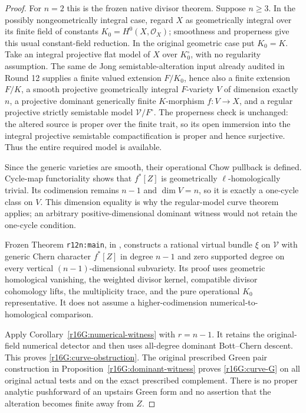 \begin{proof}
For $n=2$ this is the frozen native divisor theorem.  Suppose
$n\geq3$.  In the possibly nongeometrically integral case,
regard $X$ as geometrically integral over its finite field
of constants $K_0=H^0(X,\mathcal O_X)$; smoothness and
properness give this usual constant-field reduction.
In the original geometric case put $K_0=K$.
Take an integral projective flat model of $X$ over
$K_0^\circ$, with no regularity assumption.  The same
de Jong semistable-alteration input already audited in
Round 12 supplies a finite valued extension $F/K_0$, hence
also a finite extension $F/K$, a smooth
projective geometrically integral $F$-variety $V$ of
dimension exactly $n$, a projective dominant generically
finite $K$-morphism $f:V\to X$, and a regular projective
strictly semistable model $\mathcal V/F^\circ$.
The properness check is unchanged: the altered source is
proper over the finite trait, so its open immersion into
the integral projective semistable compactification is
proper and hence surjective.  Thus the entire required
model is available.

Since the generic varieties are smooth, their operational
Chow pullback is defined.  Cycle-map functoriality shows
that $f^*[Z]$ is geometrically $\ell$-homologically trivial.
Its codimension remains $n-1$ and $\dim V=n$, so it is
exactly a one-cycle class on $V$.  This dimension equality
is why the regular-model curve theorem applies; an
arbitrary positive-dimensional dominant witness would
not retain the one-cycle condition.

Frozen Theorem \texttt{r12n:main}, in
,
constructs a rational virtual bundle $\xi$ on
$\mathcal V$ with generic Chern character $f^*[Z]$ in
degree $n-1$ and zero supported degree on every vertical
$(n-1)$-dimensional subvariety.  Its proof uses geometric
homological vanishing, the weighted divisor kernel,
compatible divisor cohomology lifts, the multiplicity
trace, and the pure operational $K_0$ representative.
It does not assume a higher-codimension numerical-to-
homological comparison.

Apply Corollary~\ref{r16G:numerical-witness} with $r=n-1$.
It retains the original-field numerical detector and then
uses all-degree dominant Bott--Chern descent.  This proves
\eqref{r16G:curve-obstruction}.  The original prescribed
Green pair construction in
Proposition~\ref{r16G:dominant-witness} proves
\eqref{r16G:curve-G} on all original actual tests and on
the exact prescribed complement.  There is no proper
analytic pushforward of an upstairs Green form and no
assertion that the alteration becomes finite away from
$Z$.
\end{proof}

